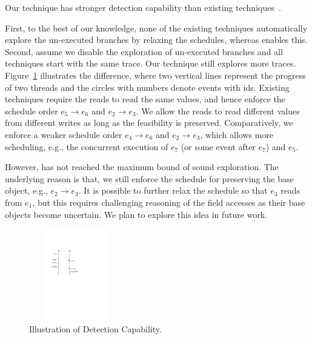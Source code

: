 \begin{mydiscussion}
Our technique has stronger detection capability than existing techniques~\cite{yannis,jeff, said}.
\end{mydiscussion}

First, to the best of our knowledge, none of the existing techniques 
automatically explore the un-executed branches by relaxing the schedules, whereas \tool enables this.
Second, assume we disable the exploration of un-executed branches and all 
techniques start with the same trace. Our technique still explores more 
traces. Figure~\ref{fig:discuss} illustrates the difference, where two 
vertical lines represent the progress of two threads and the circles 
with numbers denote events with ids. 
Existing techniques require the reads to read the same values, and hence
enforce the schedule order $e_5 \rightarrow e_6$ and $e_2\rightarrow e_3$. 
We allow the reads to read different values from different writes as long as 
the feasibility is preserved. Comparatively, we enforce a weaker 
schedule order  $e_4 \rightarrow e_6$ and $e_2\rightarrow e_3$, which 
allows more scheduling, e.g., the concurrent execution of $e_7$ (or 
some event after $e_7$) and $e_5$.

However, \tool has not reached the maximum bound of sound exploration.
The underlying reason is that, we still enforce the schedule for 
preserving the base object, e.g., $e_2\rightarrow e_3$. It is possible 
to further relax the schedule so that $e_3$ reads from $e_1$, but 
this requires challenging reasoning of the field accesses as their base 
objects become uncertain. We plan to explore this idea in future work.




\begin{figure}[htp]
\centering
\includegraphics[width=4cm,height=4cm]{figs/Visio-discuss.pdf}
\caption{Illustration of Detection Capability.}\label{fig:discuss}
\end{figure}




